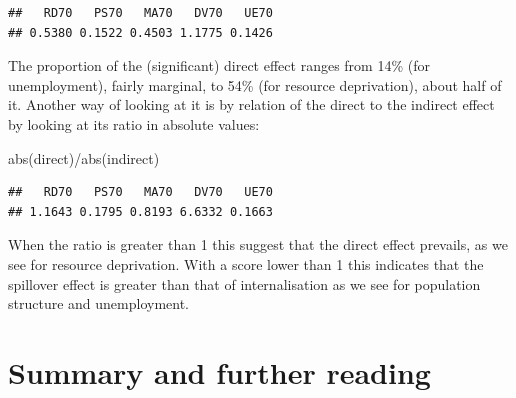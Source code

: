 \documentclass[
  krantz2]{krantz}
\makeatletter
\newenvironment{Shaded}{\begin{snugshade}}{\end{snugshade}}
\newcommand{\FunctionTok}[1]{\textcolor[rgb]{0,0,0}{#1}}
\newcommand{\NormalTok}[1]{#1}
\newcommand{\SpecialCharTok}[1]{\textcolor[rgb]{0,0,0}{#1}}
\newenvironment{kframe}{%
\medskip{}
\setlength{\fboxsep}{.8em}
 \def\at@end@of@kframe{}%
 \ifinner\ifhmode%
  \def\at@end@of@kframe{\end{minipage}}%
  \begin{minipage}{\columnwidth}%
 \fi\fi%
 \def\FrameCommand##1{\hskip\@totalleftmargin \hskip-\fboxsep
 \colorbox{shadecolor}{##1}\hskip-\fboxsep
     \hskip-\linewidth \hskip-\@totalleftmargin \hskip\columnwidth}%
 \MakeFramed {\advance\hsize-\width
   \@totalleftmargin\z@ \linewidth\hsize
   \@setminipage}}%
 {\par\unskip\endMakeFramed%
 \at@end@of@kframe}
\renewenvironment{Shaded}{\begin{kframe}}{\end{kframe}}
\makeatother
\begin{document}
\begin{verbatim}
##   RD70   PS70   MA70   DV70   UE70 
## 0.5380 0.1522 0.4503 1.1775 0.1426
\end{verbatim}

The proportion of the (significant) direct effect ranges from 14\% (for unemployment), fairly marginal, to 54\% (for resource deprivation), about half of it. Another way of looking at it is by relation of the direct to the indirect effect by looking at its ratio in absolute values:

\begin{Shaded}
\begin{Highlighting}[]
\FunctionTok{abs}\NormalTok{(direct)}\SpecialCharTok{/}\FunctionTok{abs}\NormalTok{(indirect)}
\end{Highlighting}
\end{Shaded}

\begin{verbatim}
##   RD70   PS70   MA70   DV70   UE70 
## 1.1643 0.1795 0.8193 6.6332 0.1663
\end{verbatim}

When the ratio is greater than 1 this suggest that the direct effect prevails, as we see for resource deprivation. With a score lower than 1 this indicates that the spillover effect is greater than that of internalisation as we see for population structure and unemployment.

\hypertarget{summary-and-further-reading-7}{%
\section{Summary and further reading}\label{summary-and-further-reading-7}}
\end{document}
